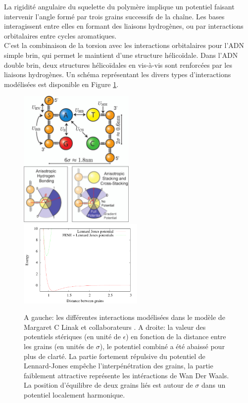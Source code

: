 \documentclass[a4paper,11pt]{article}
\begin{document}
La rigidité angulaire du squelette du polymère implique un potentiel faisant  intervenir l'angle formé par trois grains successifs de la chaîne. Les bases interagissent entre elles en formant des liaisons hydrogènes, ou par interactions orbitalaires entre cycles aromatiques.\\

 C'est la combinaison de la torsion avec les interactions orbitalaires pour l'ADN simple brin, qui permet le maintient d'une structure hélicoïdale. Dans l'ADN double brin, deux structures hélicoïdales en vis-à-vis sont renforcées par les liaisons hydrogènes. Un schéma représentant les divers types d'interactions modélisées est disponible en Figure \ref{moldyn}.\\



\begin{figure}[H]
\begin{center}
\includegraphics[width=0.5\textwidth]{moldyn.jpg}\includegraphics[width=0.54\textwidth]{potentials.pdf}


\caption{A gauche: les différentes interactions modélisées dans le modèle de Margaret C Linak et collaborateurs \cite{jchem}. A droite: la valeur des potentiels stériques (en unité de $\epsilon$) en fonction de la distance entre les grains (en unités de $\sigma$), le potentiel combiné a été abaissé pour plus de clarté. La partie fortement répulsive du potentiel de Lennard-Jones empêche l'interpénétration des grains, la partie faiblement attractive représente les intéractions de Wan Der Waals. La position d'équilibre de deux grains liés est autour de $\sigma$ dans un potentiel localement harmonique.}
\label{moldyn}
\end{center}
\end{figure}
\end{document}
